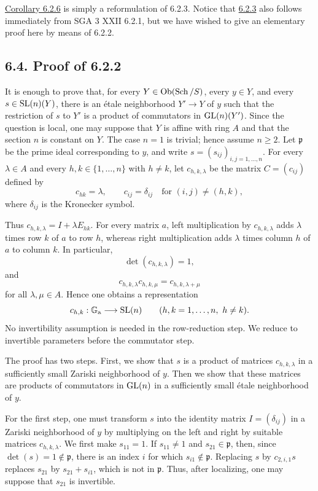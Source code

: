 \hyperlink{sga6.e10.cor.6-2-6}{Corollary 6.2.6} is simply a reformulation of 6.2.3. Notice that \hyperlink{sga6.e10.cor.6-2-3}{6.2.3} also
follows immediately from SGA 3 XXII 6.2.1, but we have wished to give an
elementary proof here by means of 6.2.2.

\subsection*{6.4. Proof of 6.2.2}
It is enough to prove that, for every $Y\in\operatorname{Ob}(\operatorname{Sch}/S)$, every $y\in Y$,
and every $s\in\operatorname{SL}(n)(Y)$, there is an \'etale neighborhood $Y'\to Y$ of
$y$ such that the restriction of $s$ to $Y'$ is a product of commutators
in $\operatorname{GL}(n)(Y')$. Since the question is local, one may suppose that $Y$ is
affine with ring $A$ and that the section $n$ is constant on $Y$. The case
$n=1$ is trivial; hence assume $n\geq2$. Let
$\mathfrak p$ be the prime ideal corresponding to $y$, and write
$s=(s_{ij})_{i,j=1,\ldots,n}$. For every $\lambda\in A$ and every
$h,k\in\{1,\ldots,n\}$ with $h\ne k$, let $c_{h,k,\lambda}$ be the matrix
$C=(c_{ij})$ defined by
\[
c_{hk}=\lambda,\qquad
c_{ij}=\delta_{ij}\quad\text{for }(i,j)\ne(h,k),
\]
where $\delta_{ij}$ is the Kronecker symbol.

Thus $c_{h,k,\lambda}=I+\lambda E_{hk}$. For every matrix $a$, left
multiplication by $c_{h,k,\lambda}$ adds $\lambda$ times row $k$ of $a$ to
row $h$, whereas right multiplication adds $\lambda$ times column $h$ of
$a$ to column $k$. In particular,
\[
\det(c_{h,k,\lambda})=1,
\]
and
\begin{equation}\tag{6.3.1}
c_{h,k,\lambda}c_{h,k,\mu}=c_{h,k,\lambda+\mu}
\end{equation}
for all $\lambda,\mu\in A$. Hence one obtains a representation
\[
c_{h,k}:\mathbb G_{\mathrm a}\longrightarrow\operatorname{SL}(n)
\qquad(h,k=1,\ldots,n,\ h\ne k).
\]
No invertibility assumption is needed in the row-reduction step. We reduce
to invertible parameters before the commutator step.

The proof has two steps. First, we show that $s$ is a product of matrices
$c_{h,k,\lambda}$ in a sufficiently small Zariski neighborhood of $y$.
Then we show that these matrices are products of commutators in $\operatorname{GL}(n)$ in
a sufficiently small \'etale neighborhood of $y$.

For the first step, one must transform $s$ into the identity matrix
$I=(\delta_{ij})$ in a Zariski neighborhood of $y$ by multiplying on the
left and right by suitable matrices $c_{h,k,\lambda}$. We first make
$s_{11}=1$. If $s_{11}\ne1$ and $s_{21}\in\mathfrak p$, then, since
$\det(s)=1\notin\mathfrak p$, there is an index $i$ for which
$s_{i1}\notin\mathfrak p$. Replacing $s$ by $c_{2,i,1}s$ replaces
$s_{21}$ by $s_{21}+s_{i1}$, which is not in $\mathfrak p$. Thus, after
localizing, one may suppose that $s_{21}$ is invertible.

